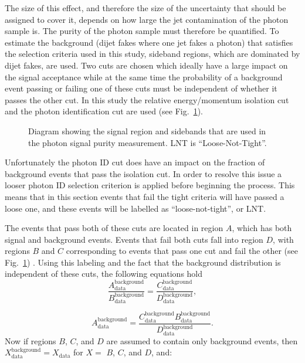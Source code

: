 The size of this effect, and therefore the size of the uncertainty that should be assigned to cover it, depends on how large the jet contamination of the photon sample is.  
The purity of the photon sample must therefore be quantified.  
To estimate the background (dijet fakes where one jet fakes a photon) that  satisfies the selection criteria used in this study, sideband regions, which are dominated by dijet fakes, are used.  
Two cuts are chosen which ideally have a large impact on the signal acceptance while at the same time the probability of a background event passing or failing one of these cuts must be independent of whether it passes the other cut.  
In this study the relative energy/momentum isolation cut and the photon identification cut are used (see Fig.~\ref{ABCD}).  

\begin{figure}[!ht]
\begin{center}
\end{center}
\caption[Sideband method]
{\small Diagram showing the signal region and sidebands that are used in the photon signal purity measurement.  LNT is ``Loose-Not-Tight''.  }
\label{ABCD}
\end{figure}

Unfortunately the photon ID cut does have an impact on the fraction of background events that pass the isolation cut.  
In order to resolve this issue a looser photon ID selection criterion is applied before beginning the process.  
This means that in this section events that fail the tight criteria will have passed a loose one, and these events will be labelled as ``loose-not-tight'', or LNT.  

The events that pass both of these cuts are located in region $A$, which has both signal and background events.
Events that fail both cuts fall into region $D$, with regions $B$ and $C$ corresponding to events that pass one cut and fail the other (see Fig.~\ref{ABCD}) .   
Using this labeling and the fact that the background distribution is independent of these cuts, the following equations hold
\begin{equation}
 \frac{A_{\mathrm{data}}^{\mathrm{background}}}{B_{\mathrm{data}}^{\mathrm{background}}} = \frac{C_{\mathrm{data}}^{\mathrm{background}}}{D_{\mathrm{data}}^{\mathrm{background}}},
\end{equation}

\begin{equation}
 A_{\mathrm{data}}^{\mathrm{background}} =  \frac{C_{\mathrm{data}}^{\mathrm{background}}B_{\mathrm {data}}^{\mathrm{background}}}{D_{\mathrm {data}}^{\mathrm{background}}}. 
\end{equation}
\noindent 
Now if regions $B$, $C$, and $D$ are assumed to contain only background events, then $X_{\mathrm{data}}^{\mathrm{background}}=X_{\mathrm{data}}$ for $X=$ $B$, $C$, and $D$, and:

